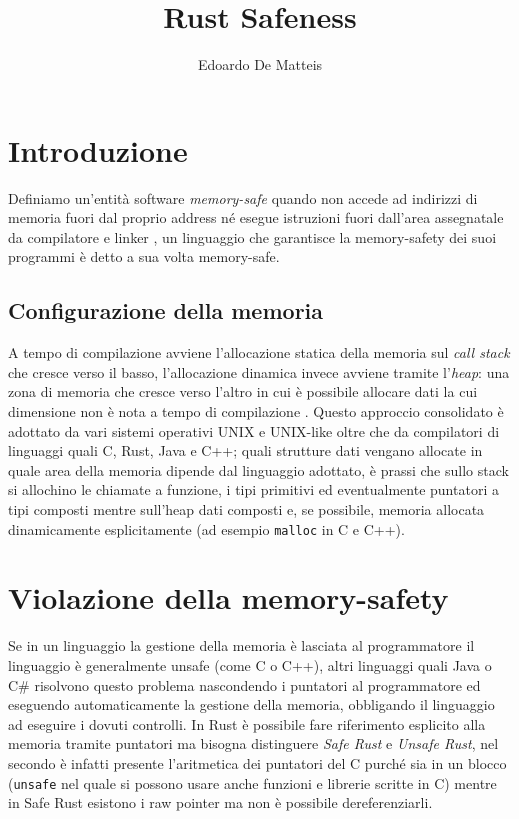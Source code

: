 \documentclass{article}
\title{Rust Safeness}
\author{Edoardo De Matteis}
\begin{document}
\maketitle
\tableofcontents

\clearpage 

\section{Introduzione}
Definiamo un'entità software \emph{memory-safe} quando non accede ad indirizzi di memoria fuori dal proprio address né esegue istruzioni fuori dall'area assegnatale da compilatore e linker \cite{paper:def}, un linguaggio che garantisce la memory-safety dei suoi programmi è detto a sua volta memory-safe.

\subsection{Configurazione della memoria}
A tempo di compilazione avviene l'allocazione statica della memoria sul \emph{call stack} che cresce verso il basso, l'allocazione dinamica invece avviene tramite l'\emph{heap}: una zona di memoria che cresce verso l'altro in cui è possibile allocare dati la cui dimensione non è nota a tempo di compilazione \cite{gollmann:computersecurity}. Questo approccio consolidato è adottato da vari sistemi operativi UNIX e UNIX-like oltre che da compilatori di linguaggi quali C, Rust, Java e C++; quali strutture dati vengano allocate in quale area della memoria dipende dal linguaggio adottato, è prassi che sullo stack si allochino le chiamate a funzione, i tipi primitivi ed eventualmente puntatori a tipi composti mentre sull'heap dati composti e, se possibile, memoria allocata dinamicamente esplicitamente (ad esempio \texttt{malloc} in C e C++).

\section{Violazione della memory-safety}
Se in un linguaggio la gestione della memoria è lasciata al programmatore il linguaggio è generalmente unsafe (come C o C++), altri linguaggi quali Java o C\# risolvono questo problema nascondendo i puntatori al programmatore ed eseguendo automaticamente la gestione della memoria, obbligando il linguaggio ad eseguire i dovuti controlli. In Rust è possibile fare riferimento esplicito alla memoria tramite puntatori ma bisogna distinguere \emph{Safe Rust} e \emph{Unsafe Rust}, nel secondo è infatti presente l'aritmetica dei puntatori del C purché sia in un blocco (\texttt{unsafe} nel quale si possono usare anche funzioni e librerie scritte in C) mentre in Safe Rust esistono i raw pointer ma non è possibile dereferenziarli.  
\end{document}
